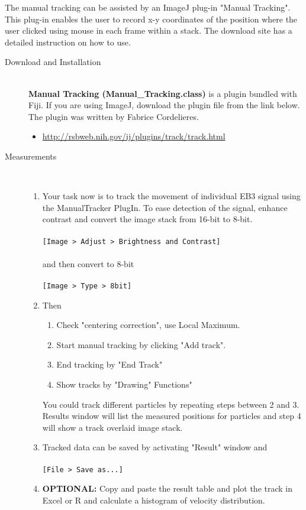 \documentclass[11pnt]{article}
\begin{document}
The manual tracking can be assisted by an ImageJ plug-in
"Manual Tracking". This plug-in
enables the user to record x-y coordinates of the position where the
user clicked using mouse in each frame within a stack. The download
site has a detailed instruction on how to use.  

\begin{description}
\item[Download and Installation]\hfill\\

\textbf{Manual Tracking (Manual\_Tracking.class)} is a plugin bundled with Fiji. If you are using ImageJ, download the plugin file from the link below. The plugin was written by Fabrice Cordelieres.
\begin{itemize}
\item \url{http://rsbweb.nih.gov/ij/plugins/track/track.html}
\end{itemize}

\item[Measurements]\hfill\\

\begin{enumerate}
\item Your task now is to track the movement of individual EB3 signal using the ManualTracker PlugIn. To ease detection of the signal, enhance contrast and convert the image stack from 16-bit to 8-bit.
\\
\\
\verb"[Image > Adjust > Brightness and Contrast]"
\\
\\
and then convert to 8-bit
\\
\\
\verb"[Image > Type > 8bit]"
\\
\item Then 
\begin{enumerate}
\item Check "centering correction", use Local Maximum.
\item Start manual tracking by clicking "Add track".
\item End tracking by "End Track"
\item Show tracks by "Drawing" Functions"
\end{enumerate}

You could track different particles by repeating steps between 2 and 3. Results window will list the measured positions for particles and step 4 will show a track overlaid image stack.

\item Tracked data can be saved by activating "Result" window and 
\\
\\
\verb"[File > Save as...]"
\\
\item \textbf{OPTIONAL:} Copy and paste the result table and plot the track in Excel or R and calculate a histogram of velocity distribution.
\end{enumerate}

\end{description}
\end{document}
